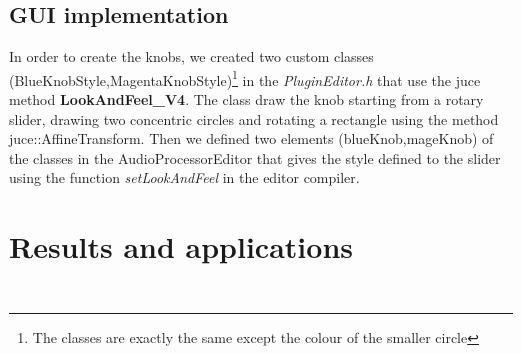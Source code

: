 \documentclass[a4paper,12pt]{report}
\begin{document}
\subsection{GUI implementation}
In order to create the knobs, we created two custom classes (BlueKnobStyle,MagentaKnobStyle)\footnote{The classes are exactly the same except the colour of the smaller circle} in the \emph{PluginEditor.h} that use the juce method \textbf{LookAndFeel\_V4}. The class draw the knob starting from a rotary slider, drawing two concentric circles and rotating a rectangle using the method juce::AffineTransform. Then we defined two elements (blueKnob,mageKnob) of the classes in the AudioProcessorEditor that gives the style defined to the slider using the function \emph{setLookAndFeel} in the editor compiler.

\section{Results and applications}

\begin{verbatim}

\end{verbatim}


\begin{verbatim}

\end{verbatim}
\end{document}
